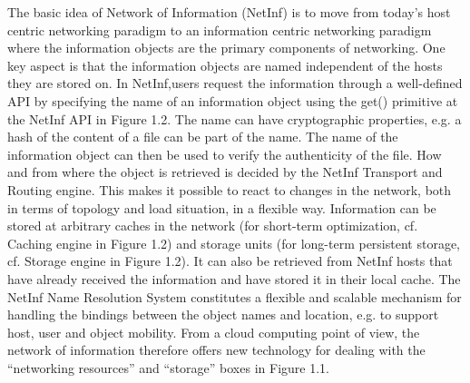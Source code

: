 The basic idea of Network of Information (NetInf) is to
move from today’s host centric networking paradigm to an
information centric networking paradigm where the
information objects are the primary components of
networking. One key aspect is that the information objects
are named independent of the hosts they are stored on. In NetInf,users request the information through a well-defined API by
specifying the name of an information object using the get()
primitive at the NetInf API in Figure 1.2. The name can have
cryptographic properties, e.g. a hash of the content of a file
can be part of the name. The name of the information object
can then be used to verify the authenticity of the file. How
and from where the object is retrieved is decided by the
NetInf Transport and Routing engine. This makes it possible
to react to changes in the network, both in terms of topology
and load situation, in a flexible way. Information can be
stored at arbitrary caches in the network (for short-term
optimization, cf. Caching engine in Figure 1.2) and storage
units (for long-term persistent storage, cf. Storage engine in
Figure 1.2). It can also be retrieved from NetInf hosts that have
already received the information and have stored it in their
local cache. The NetInf Name Resolution System constitutes
a flexible and scalable mechanism for handling the bindings
between the object names and location, e.g. to support host,
user and object mobility. From a cloud computing point of
view, the network of information therefore offers new
technology for dealing with the “networking resources” and
“storage” boxes in Figure 1.1.
